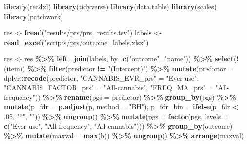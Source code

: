\documentclass[
]{article}
\newenvironment{Shaded}{\begin{snugshade}}{\end{snugshade}}
\newcommand{\AttributeTok}[1]{\textcolor[rgb]{0.13,0.29,0.53}{#1}}
\newcommand{\DecValTok}[1]{\textcolor[rgb]{0.00,0.00,0.81}{#1}}
\newcommand{\FunctionTok}[1]{\textcolor[rgb]{0.13,0.29,0.53}{\textbf{#1}}}
\newcommand{\NormalTok}[1]{#1}
\newcommand{\OtherTok}[1]{\textcolor[rgb]{0.56,0.35,0.01}{#1}}
\newcommand{\SpecialCharTok}[1]{\textcolor[rgb]{0.81,0.36,0.00}{\textbf{#1}}}
\newcommand{\StringTok}[1]{\textcolor[rgb]{0.31,0.60,0.02}{#1}}
\begin{document}
\begin{Shaded}
\begin{Highlighting}[]
\FunctionTok{library}\NormalTok{(readxl)}
\FunctionTok{library}\NormalTok{(tidyverse)}
\FunctionTok{library}\NormalTok{(data.table)}
\FunctionTok{library}\NormalTok{(scales)}
\FunctionTok{library}\NormalTok{(patchwork)}

\NormalTok{res }\OtherTok{\textless{}{-}} \FunctionTok{fread}\NormalTok{(}\StringTok{"results/prs/prs\_results.tsv"}\NormalTok{)}
\NormalTok{labels }\OtherTok{\textless{}{-}} \FunctionTok{read\_excel}\NormalTok{(}\StringTok{"scripts/prs/outcome\_labels.xlsx"}\NormalTok{)}

\NormalTok{res }\OtherTok{\textless{}{-}}\NormalTok{ res }\SpecialCharTok{\%\textgreater{}\%} 
  \FunctionTok{left\_join}\NormalTok{(labels, }\AttributeTok{by=}\FunctionTok{c}\NormalTok{(}\StringTok{"outcome"}\OtherTok{=}\StringTok{"name"}\NormalTok{)) }\SpecialCharTok{\%\textgreater{}\%} 
  \FunctionTok{select}\NormalTok{(}\SpecialCharTok{!}\NormalTok{(item)) }\SpecialCharTok{\%\textgreater{}\%} 
  \FunctionTok{filter}\NormalTok{(predictor }\SpecialCharTok{!=} \StringTok{"(Intercept)"}\NormalTok{) }\SpecialCharTok{\%\textgreater{}\%} 
  \FunctionTok{mutate}\NormalTok{(}\AttributeTok{predictor =}\NormalTok{ dplyr}\SpecialCharTok{::}\FunctionTok{recode}\NormalTok{(predictor, }\StringTok{"CANNABIS\_EVR\_prs"} \OtherTok{=} \StringTok{"Ever use"}\NormalTok{,}
                            \StringTok{"CANNABIS\_FACTOR\_prs"} \OtherTok{=} \StringTok{"All{-}cannabis"}\NormalTok{,}
                            \StringTok{"FREQ\_MA\_prs"} \OtherTok{=} \StringTok{"All{-}frequency"}\NormalTok{)) }\SpecialCharTok{\%\textgreater{}\%} 
  \FunctionTok{rename}\NormalTok{(}\AttributeTok{pgs =}\NormalTok{ predictor) }\SpecialCharTok{\%\textgreater{}\%} 
  \FunctionTok{group\_by}\NormalTok{(pgs) }\SpecialCharTok{\%\textgreater{}\%} 
  \FunctionTok{mutate}\NormalTok{(}\AttributeTok{p\_fdr =} \FunctionTok{p.adjust}\NormalTok{(p, }\AttributeTok{method =} \StringTok{"BH"}\NormalTok{),         }
         \AttributeTok{p\_fdr\_bin =} \FunctionTok{ifelse}\NormalTok{(p\_fdr }\SpecialCharTok{\textless{}}\NormalTok{ .}\DecValTok{05}\NormalTok{, }\StringTok{"*"}\NormalTok{, }\StringTok{""}\NormalTok{)) }\SpecialCharTok{\%\textgreater{}\%} 
  \FunctionTok{ungroup}\NormalTok{() }\SpecialCharTok{\%\textgreater{}\%} 
  \FunctionTok{mutate}\NormalTok{(}\AttributeTok{pgs =} \FunctionTok{factor}\NormalTok{(pgs, }\AttributeTok{levels =} \FunctionTok{c}\NormalTok{(}\StringTok{"Ever use"}\NormalTok{, }\StringTok{"All{-}frequency"}\NormalTok{, }\StringTok{"All{-}cannabis"}\NormalTok{))) }\SpecialCharTok{\%\textgreater{}\%} 
  \FunctionTok{group\_by}\NormalTok{(outcome) }\SpecialCharTok{\%\textgreater{}\%} 
  \FunctionTok{mutate}\NormalTok{(}\AttributeTok{maxval =} \FunctionTok{max}\NormalTok{(b)) }\SpecialCharTok{\%\textgreater{}\%} 
  \FunctionTok{ungroup}\NormalTok{() }\SpecialCharTok{\%\textgreater{}\%} 
  \FunctionTok{arrange}\NormalTok{(maxval)}


\end{Highlighting}
\end{Shaded}
\end{document}
